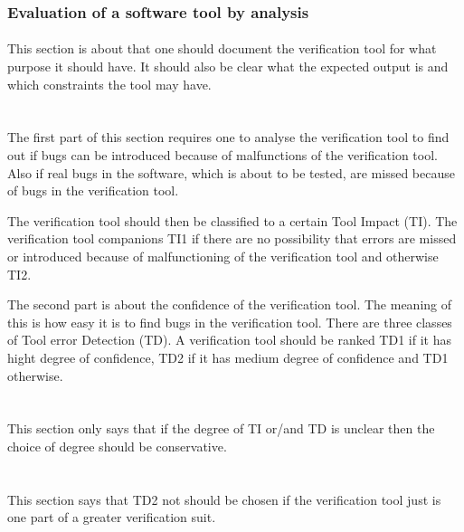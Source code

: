 \documentclass{article}
\begin{document}
\subsubsection{Evaluation of a software tool by analysis}
\paragraph{}
This section is about that one should document the verification tool for what
purpose it should have. It should also be clear what the expected output is and
which constraints the tool may have. \\\\
\paragraph{}
The first part of this section requires one to analyse the verification tool to
find out if bugs can be introduced because of malfunctions of the verification
tool. Also if real bugs in the software, which is about to be tested, are missed
because of bugs in the verification tool.

The verification tool should then be classified to a certain Tool Impact (TI).
The verification tool companions TI1 if there are no possibility that
errors are missed or introduced because of malfunctioning of the verification
tool and otherwise TI2.

The second part is about the confidence of the verification tool. The meaning of
this is how easy it is to find bugs in the verification tool. There are three
classes of Tool error Detection (TD). A verification tool should be ranked TD1
if it has hight degree of confidence, TD2 if it has medium degree of confidence
and TD1 otherwise.
\\\\
\paragraph{}
This section only says that if the degree of TI or/and TD is unclear then the
choice of degree should be conservative. \\\\
\paragraph{}
This section says that TD2 not should be chosen if the verification tool just is
one part of a greater verification suit. \\\\
\end{document}
